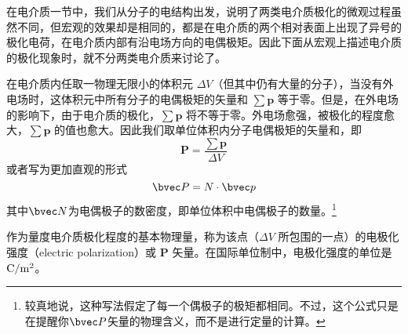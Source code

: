 
\begin{issues}
\end{issues}


在电介质一节中，我们从分子的电结构出发，说明了两类电介质极化的微观过程虽然不同，但宏观的效果却是相同的，都是在电介质的两个相对表面上出现了异号的极化电荷，在电介质内部有沿电场方向的电偶极矩。因此下面从宏观上描述电介质的极化现象时，就不分两类电介质来讨论了。

在电介质内任取一物理无限小的体积元 $\Delta V$（但其中仍有大量的分子），当没有外电场时，这体积元中所有分子的电偶极矩的矢量和 $\sum \mathbf p$ 等于零。但是，在外电场的影响下，由于电介质的极化，$\sum \mathbf p$ 将不等于零。外电场愈强，被极化的程度愈大，$\sum \mathbf p$ 的值也愈大。因此我们取单位体积内分子电偶极矩的矢量和，即
\begin{equation}
\mathbf P=\frac{\sum \mathbf p}{\Delta V} 
\end{equation}
或者写为更加直观的形式
\begin{equation}
\bvec P = N \cdot \bvec p
\end{equation}
其中$\bvec N$为电偶极子的数密度，即单位体积中电偶极子的数量。\footnote{较真地说，这种写法假定了每一个偶极子的极矩都相同。不过，这个公式只是在提醒你$\bvec P$矢量的物理含义，而不是进行定量的计算。}

作为量度电介质极化程度的基本物理量，称为该点（$\Delta V$ 所包围的一点）的电极化强度（electric polarization）或 $\mathbf P$ 矢量。在国际单位制中，电极化强度的单位是 $\rm C/m^2$。
